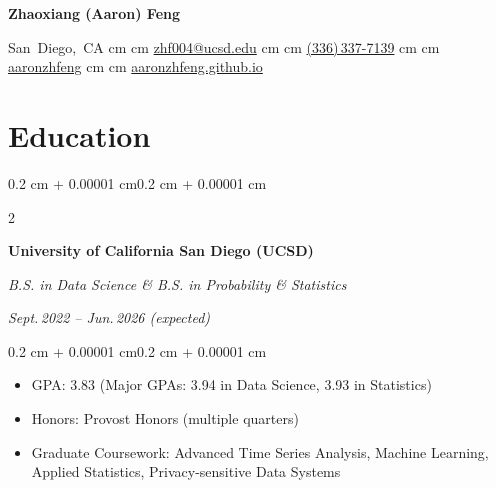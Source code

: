 \documentclass[10pt, letterpaper]{article}
\newenvironment{highlights}{
    \begin{itemize}[
        topsep=0.06 cm,
        parsep=0.06 cm,
        partopsep=0pt,
        itemsep=0pt,
        leftmargin=0.4 cm + 10pt
    ]
}{\end{itemize}}
\newenvironment{onecolentry}{
    \begin{adjustwidth}{0.2 cm + 0.00001 cm}{0.2 cm + 0.00001 cm}
}{\end{adjustwidth}}
\newenvironment{twocolentry}[2][]{
    \onecolentry
    \def\secondColumn{#2}
    \setcolumnwidth{\fill, 4.5 cm}
    \begin{paracol}{2}
}{
    \switchcolumn \raggedleft \secondColumn
    \end{paracol}
    \endonecolentry
}
\newenvironment{header}{
    \setlength{\topsep}{0pt}\par\kern\topsep\centering\linespread{1.5}
}{
    \par\kern\topsep
}
\newcommand{\AND}{\unskip\enspace\textbar\enspace}
\begin{document}
    \begin{header}
        \textbf{\fontsize{24 pt}{24 pt}\selectfont Zhaoxiang (Aaron) Feng}

        \vspace{0.25 cm}

        \normalsize
        \mbox{{\footnotesize\faMapMarker*}\hspace*{0.13cm}San Diego, CA}%
         cm\AND{} cm%
        \mbox{{\footnotesize\faEnvelope[regular]}\hspace*{0.13cm}\href{mailto:zhf004@ucsd.edu}{zhf004@ucsd.edu}}%
         cm\AND{} cm%
        \mbox{{\footnotesize\faPhone*}\hspace*{0.13cm}\href{tel:+13363377139}{(336)\,337-7139}}%
         cm\AND{} cm%
        \mbox{{\footnotesize\faGithub}\hspace*{0.13cm}\href{https://github.com/aaronzhfeng}{aaronzhfeng}}%
         cm\AND{} cm%
        \mbox{{\footnotesize\faGlobe}\hspace*{0.13cm}\href{https://aaronzhfeng.github.io}{aaronzhfeng.github.io}}%
    \end{header}

    \vspace{0.15 cm}

    \section{Education}

    \begin{twocolentry}{\textit{Sept.\,2022 -- Jun.\,2026 (expected)}}
        \textbf{University of California San Diego (UCSD)}

        \textit{B.S. in Data Science \& B.S. in Probability \& Statistics}
    \end{twocolentry}

    \vspace{0.06 cm}
    \begin{onecolentry}
        \begin{highlights}
            \item GPA: 3.83 (Major GPAs: 3.94 in Data Science, 3.93 in Statistics)
            \item Honors: Provost Honors (multiple quarters)
            \item Graduate Coursework: Advanced Time Series Analysis, Machine Learning, Applied Statistics, Privacy-sensitive Data Systems
        \end{highlights}
    \end{onecolentry}
\end{document}
